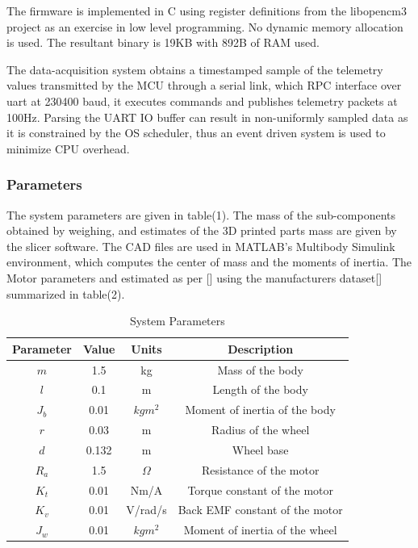         The firmware is implemented in C using register definitions from the 
        libopencm3 project \cite{BeginningSTM32} as an exercise in low level programming. 
        No dynamic memory allocation is used.
        The resultant binary is 19KB with 892B of RAM used.
       
        The data-acquisition system obtains a timestamped sample of the 
        telemetry values transmitted by the MCU through a serial link, which 
        RPC interface over uart at 230400 baud, 
        it executes commands and publishes telemetry packets at 100Hz.
        Parsing the UART IO buffer can result in non-uniformly sampled data as it
        is constrained by the OS scheduler, thus an event driven system is used to 
        minimize CPU overhead.
        \pagebreak{}
        \subsubsection{Parameters }
        The system parameters are given in table(1). 
        The mass of the sub-components obtained by weighing,
        and estimates of the 3D printed parts mass are given by the slicer software. 
        The CAD files are used in MATLAB's Multibody Simulink environment, which 
        computes the center of mass and the moments of inertia.
        The Motor parameters and estimated as per [] using the manufacturers dataset[] summarized in table(2).
    
        \begin{table} [H]
            \centering
            \begin{tabular}{|c|c|c|c|}
                \hline
                Parameter & Value & Units & Description \\
                \hline
                $m$ & 1.5 & kg & Mass of the body \\
                $l$ & 0.1 & m & Length of the body \\
                $J_b$ & 0.01 & $kgm^2$ & Moment of inertia of the body \\
                $r$ & 0.03 & m & Radius of the wheel \\
                $d$ & 0.132 & m & Wheel base \\
                $R_a$ & 1.5 & $\Omega$ & Resistance of the motor \\
                $K_t$ & 0.01 & Nm/A & Torque constant of the motor \\
                $K_v$ & 0.01 & V/rad/s & Back EMF constant of the motor \\
                $J_w$ & 0.01 & $kgm^2$ & Moment of inertia of the wheel \\
                \hline
            \end{tabular}
            \caption{System Parameters}
        \end{table}


